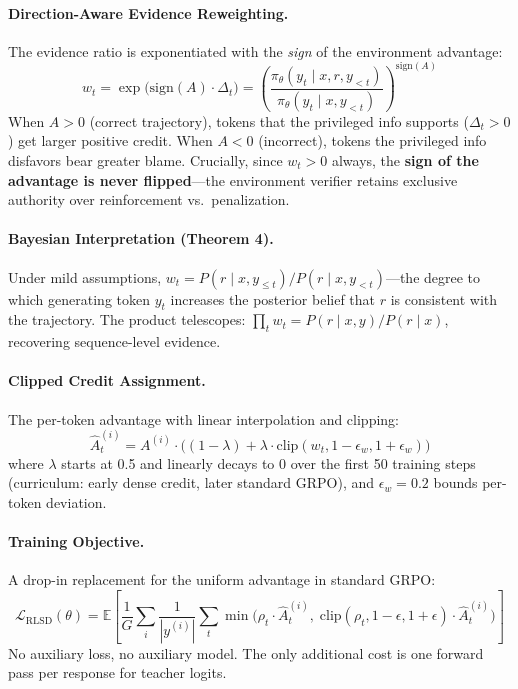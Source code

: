 \documentclass[11pt]{article}
\begin{document}
\paragraph{Direction-Aware Evidence Reweighting.}
The evidence ratio is exponentiated with the \textit{sign} of the environment advantage:
\begin{equation}
    w_t = \exp\!\big(\mathrm{sign}(A) \cdot \Delta_t\big) = \left(\frac{\pi_\theta(y_t \mid x, r, y_{<t})}{\pi_\theta(y_t \mid x, y_{<t})}\right)^{\!\mathrm{sign}(A)}
\end{equation}
When $A > 0$ (correct trajectory), tokens that the privileged info supports ($\Delta_t > 0$) get larger positive credit. When $A < 0$ (incorrect), tokens the privileged info disfavors bear greater blame. Crucially, since $w_t > 0$ always, the \textbf{sign of the advantage is never flipped}---the environment verifier retains exclusive authority over reinforcement vs.\ penalization.

\paragraph{Bayesian Interpretation (Theorem 4).}
Under mild assumptions, $w_t = P(r \mid x, y_{\leq t}) / P(r \mid x, y_{<t})$---the degree to which generating token $y_t$ increases the posterior belief that $r$ is consistent with the trajectory. The product telescopes: $\prod_t w_t = P(r \mid x, y) / P(r \mid x)$, recovering sequence-level evidence.

\paragraph{Clipped Credit Assignment.}
The per-token advantage with linear interpolation and clipping:
\begin{equation}
    \hat{A}_t^{(i)} = A^{(i)} \cdot \Big((1 - \lambda) + \lambda \cdot \mathrm{clip}(w_t, 1 - \epsilon_w, 1 + \epsilon_w)\Big)
\end{equation}
where $\lambda$ starts at 0.5 and linearly decays to 0 over the first 50 training steps (curriculum: early dense credit, later standard GRPO), and $\epsilon_w = 0.2$ bounds per-token deviation.

\paragraph{Training Objective.}
A drop-in replacement for the uniform advantage in standard GRPO:
\begin{equation}
    \mathcal{L}_{\mathrm{RLSD}}(\theta) = \mathbb{E}\!\left[\frac{1}{G}\sum_i \frac{1}{|y^{(i)}|}\sum_t \min\!\Big(\rho_t \cdot \hat{A}_t^{(i)},\; \mathrm{clip}(\rho_t, 1\!-\!\epsilon, 1\!+\!\epsilon) \cdot \hat{A}_t^{(i)}\Big)\right]
\end{equation}
No auxiliary loss, no auxiliary model. The only additional cost is one forward pass per response for teacher logits.
\end{document}

